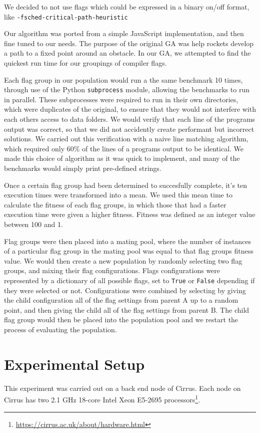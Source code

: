 \documentclass[conference]{IEEEtran}
\begin{document}
We decided to not use flags which could be expressed in a binary on/off format, like \texttt{-fsched-critical-path-heuristic} 

Our algorithm was ported from a simple JavaScript implementation\cite{Shiffman16}, and then fine tuned to our needs. The purpose of the original GA was help rockets develop a path to a fixed point around an obstacle. In our GA, we attempted to find the quickest run time for our groupings of compiler flags.

Each flag group in our population would run a the same benchmark 10 times, through use of the Python \texttt{subprocess} module, allowing the benchmarks to run in parallel. These subprocesses were required to run in their own directories, which were duplicates of the original, to ensure that they would not interfere with each others access to data folders. We would verify that each line of the programs output was correct, so that we did not accidently create performant but incorrect solutions. We carried out this verification with a naive line matching algorithm, which required only 60\% of the lines of a programs output to be identical. We made this choice of algorithm as it was quick to implement, and many of the benchmarks would simply print pre-defined strings.

Once a certain flag group had been determined to succesfully complete, it's ten execution times were transformed into a mean.  We used this mean time to calculate the fitness of each flag groups, in which those that had a faster execution time were given a higher fitness. Fitness was defined as an integer value between 100 and 1.

Flag groups were then placed into a mating pool, where the number of instances of a particular flag group in the mating pool was equal to that flag groups fitness value. We would then create a new population by randomly selecting two flag groups, and mixing their flag configurations. Flags configurations were represented by a dictionary of all possible flags, set to \texttt{True} or \texttt{False} depending if they were selected or not. Configurations were combined by selecting by giving the child configuration all of the flag settings from parent A up to a random point, and then giving the child all of the flag settings from parent B. The child flag group would then be placed into the population pool and we restart the process of evaluating the population.


\section{Experimental Setup}
This experiment was carried out on a back end node of Cirrus. Each node on Cirrus has two 2.1 GHz 18-core Intel Xeon E5-2695 processors\footnote{\url{https://cirrus.ac.uk/about/hardware.html}}.
\end{document}
